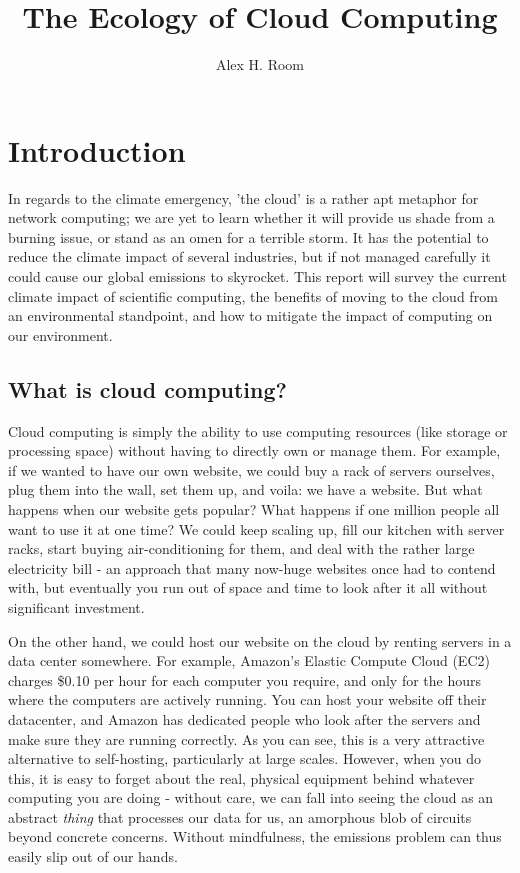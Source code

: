 \documentclass{article}
\title{The Ecology of Cloud Computing}
\author{Alex H. Room}
\begin{document}
\maketitle



\section{Introduction}

In regards to the climate emergency, 'the cloud' is a rather apt metaphor for network computing; we are yet to learn whether it will provide us shade from a burning issue, or stand as an omen for a terrible storm. It has the potential to reduce the climate impact of several industries, but if not managed carefully it could cause our global emissions to skyrocket. This report will survey the current climate impact of scientific computing, the benefits of moving to the cloud from an environmental standpoint, and how to mitigate the impact of computing on our environment.


\subsection{What is cloud computing?}
Cloud computing is simply the ability to use computing resources (like storage or processing space) without having to directly own or manage them. For example, if we wanted to have our own website, we could buy a rack of servers ourselves, plug them into the wall, set them up, and voila: we have a website. But what happens when our website gets popular? What happens if one million people all want to use it at one time? We could keep scaling up, fill our kitchen with server racks, start buying air-conditioning for them, and deal with the rather large electricity bill - an approach that many now-huge websites once had to contend with, but eventually you run out of space and time to look after it all without significant investment. \newline

On the other hand, we could host our website on the cloud by renting servers in a data center somewhere. For example, Amazon's Elastic Compute Cloud (EC2) charges \$0.10 per hour for each computer you require, and only for the hours where the computers are actively running. You can host your website off their datacenter, and Amazon has dedicated people who look after the servers and make sure they are running correctly. As you can see, this is a very attractive alternative to self-hosting, particularly at large scales. However, when you do this, it is easy to forget about the real, physical equipment behind whatever computing you are doing - without care, we can fall into seeing the cloud as an abstract \emph{thing} that processes our data for us, an amorphous blob of circuits beyond concrete concerns. Without mindfulness, the emissions problem can thus easily slip out of our hands. 
\end{document}
